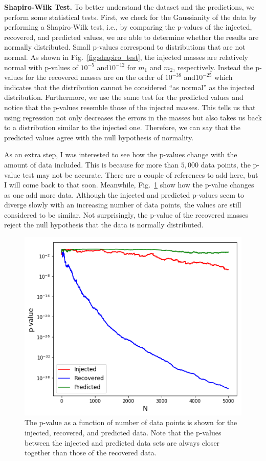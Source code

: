 \documentclass[aps,prd,twocolumn,superscriptaddress,preprintnumbers,floatfix,nofootinbib]{revtex4-2}
\begin{document}
\textbf{Shapiro-Wilk Test.} To better understand the dataset and the predictions, we perform some 
statistical tests. First, we check for the Gaussianity of the data by performing a Shapiro-Wilk 
test, i.e., by comparing the p-values of the injected, recovered, and predicted values, we are 
able to determine whether the results are normally distributed. Small p-values correspond to 
distributions that are not normal.  As shown in Fig.~\ref{fig:shapiro_test}, the injected 
masses are relatively normal with p-values of $10^{-5}$ and$10^{-12}$ for $m_1$ and 
$m_2$, respectively. Instead the p-values for the recovered masses are on the order of 
$10^{-38}$ and$10^{-25}$ which indicates that the distribution cannot be considered 
``as normal'' as the injected distribution. Furthermore, we use the same test for the predicted 
values and notice that the p-values resemble those of the injected masses. This tells us 
that using regression not only decreases the errors in the masses but also takes us back 
to a distribution similar to the injected one. Therefore, we can say that the predicted values 
agree with the null hypothesis of normality. 

As an extra step, I was interested to see how the p-values change with the amount of data 
included. This is because for more than $5,000$ data points, the p-value test may not be 
accurate. There are a couple of references to add here, but I will come back to that soon. 
Meanwhile, Fig.~\ref{fig:sw_test} show how the p-value changes as one add more data. 
Although the injected and predicted p-values seem to diverge slowly with an increasing 
number of data points, the values are still considered to be similar. Not surprisingly, the 
p-value of the recovered masses reject the null hypothesis that the data is normally 
distributed.
\begin{figure}[h]
  \centering
  \includegraphics[width=\linewidth]{SW_test.png}
  \caption{The p-value as a function of number of data points is shown for the injected, 
  		recovered, and predicted data. Note that the p-values between the injected and 
		predicted data sets are always closer together than those of the recovered data.}
  \label{fig:sw_test}
\end{figure}
\end{document}
